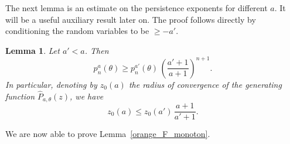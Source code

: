 \documentclass[12pt]{article}
\renewcommand{\P}{\mathbb{P}} %
\newcommand{\1}{\mathds{1}}
\theoremstyle{definition}
\theoremstyle{plain}
\newtheorem{Lemma}[definition]{Lemma}
\theoremstyle{remark}
\begin{document}
The next lemma is an estimate on the persistence exponents for different $a$. It will be a useful auxiliary result later on. The proof follows directly by conditioning the random variables to be $\geq -a'$.

\begin{Lemma} \label{lem:orangecomparisonofpes}
Let $a'<a$. Then
$$
 p_{n}^{a}(\theta)
   \geq p_n^{a'}(\theta) \, \left( \frac{a'+1}{a+1} \right)^{n+1}.
$$
In particular, denoting by $z_0(a)$ the radius of convergence of the generating function $\hat P_{a,\theta}(z)$, we have
$$
z_0(a) \leq z_0(a')\, \frac{a+1}{a'+1}.
$$
\end{Lemma}



We are now able to prove Lemma~\ref{orange_F_monoton}.
    
\end{document}
